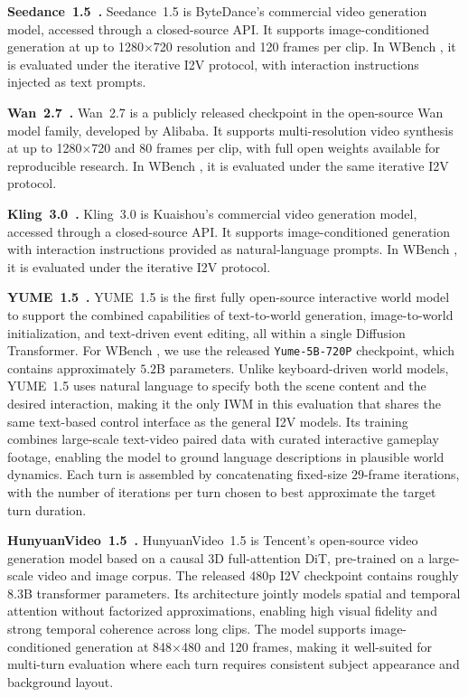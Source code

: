 \documentclass{llmxive}
\providecommand{\myparagraph}[1]{\vspace{-0.1em}\noindent\textbf{#1}\hspace{0.3em}}
\providecommand{\benchmark}{WBench }
\begin{document}
\myparagraph{Seedance~1.5~\cite{gao2025seedance15}.}
Seedance~1.5 is ByteDance's commercial video generation model, accessed through a closed-source API.
It supports image-conditioned generation at up to 1280$\times$720 resolution and 120 frames per clip.
In \benchmark, it is evaluated under the iterative I2V protocol, with interaction instructions injected as text prompts.

\myparagraph{Wan~2.7~\cite{wan2025wan27}.}
Wan~2.7 is a publicly released checkpoint in the open-source Wan model family, developed by Alibaba.
It supports multi-resolution video synthesis at up to 1280$\times$720 and 80 frames per clip, with full open weights available for reproducible research.
In \benchmark, it is evaluated under the same iterative I2V protocol.

\myparagraph{Kling~3.0~\cite{kuaishou2025kling3}.}
Kling~3.0 is Kuaishou's commercial video generation model, accessed through a closed-source API.
It supports image-conditioned generation with interaction instructions provided as natural-language prompts.
In \benchmark, it is evaluated under the iterative I2V protocol.

\myparagraph{YUME~1.5~\cite{mao2025yume15}.}
YUME~1.5 is the first fully open-source interactive world model to support the combined capabilities of text-to-world generation, image-to-world initialization, and text-driven event editing, all within a single Diffusion Transformer.
For \benchmark, we use the released \texttt{Yume-5B-720P} checkpoint, which contains approximately $5.2$B parameters.
Unlike keyboard-driven world models, YUME~1.5 uses natural language to specify both the scene content and the desired interaction, making it the only IWM in this evaluation that shares the same text-based control interface as the general I2V models.
Its training combines large-scale text-video paired data with curated interactive gameplay footage, enabling the model to ground language descriptions in plausible world dynamics.
Each turn is assembled by concatenating fixed-size $29$-frame iterations, with the number of iterations per turn chosen to best approximate the target turn duration.

\myparagraph{HunyuanVideo~1.5~\cite{kong2024hunyuanvideo}.}
HunyuanVideo~1.5 is Tencent's open-source video generation model based on a causal 3D full-attention DiT, pre-trained on a large-scale video and image corpus.
The released 480p I2V checkpoint contains roughly $8.3$B transformer parameters.
Its architecture jointly models spatial and temporal attention without factorized approximations, enabling high visual fidelity and strong temporal coherence across long clips.
The model supports image-conditioned generation at 848$\times$480 and 120 frames, making it well-suited for multi-turn evaluation where each turn requires consistent subject appearance and background layout.
\end{document}
